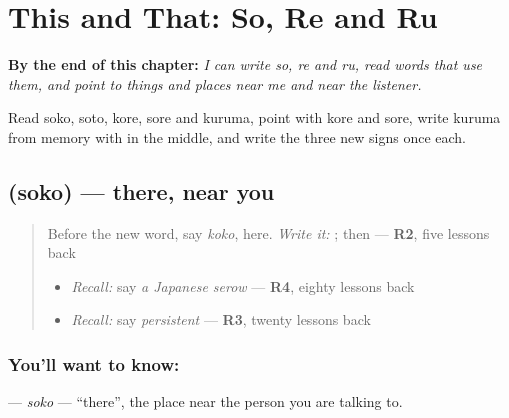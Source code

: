 
\chapter{This and That: So, Re and Ru}
\label{ch:ja-this-and-that-so-re-ru}

\begin{chapteropening}
\textbf{By the end of this chapter:} \emph{I can write so, re and ru, read words that use them, and point to things and places near me and near the listener.}

Read soko, soto, kore, sore and kuruma, point with kore and sore, write kuruma from memory with  in the middle, and write the three new signs once each.
\end{chapteropening}

\section[\texorpdfstring{\ja{そこ} (soko)}{そこ (soko)}]{ (soko) — there, near you}

\label{lesson:JA-C132-soko}



\begin{quote}
Before the new word, say \emph{koko}, here. \emph{Write it:} \textbf{}; then \textbf{} — \textbf{R2}, five lessons back

\begin{itemize}
\raggedright
  \item \emph{Recall:} say \emph{a Japanese serow} — \textbf{R4}, eighty lessons back
  \item \emph{Recall:} say \emph{persistent} — \textbf{R3}, twenty lessons back
\end{itemize}
\end{quote}

\subsection*{You'll want to know: }
\textbf{} — \emph{soko} — \textquotedblleft{}there\textquotedblright{}, the place near the person you are talking to.

